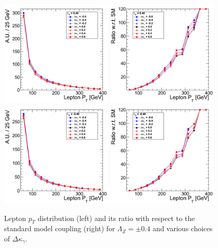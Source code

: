 \begin{figure}[h!t]
  {\centering
    \includegraphics[width=0.48\textwidth]{figs/LeptonpT_040.png}
    \includegraphics[width=0.48\textwidth]{figs/LeptonpT_040_ratio.png}
    \includegraphics[width=0.48\textwidth]{figs/LeptonpT_m040.png}
    \includegraphics[width=0.48\textwidth]{figs/LeptonpT_m040_ratio.png}
    \caption{Lepton $p_T$ distribution (left) and its ratio with respect to 
    the standard model coupling (right) for $\Lambda_Z = \pm 0.4$ and various choices of $\Delta{\kappa_\gamma}$.}
    \label{fig:ww_LeptonpT_atgcRatio04}}
\end{figure}
